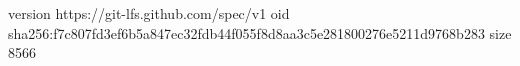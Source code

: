 version https://git-lfs.github.com/spec/v1
oid sha256:f7c807fd3ef6b5a847ec32fdb44f055f8d8aa3c5e281800276e5211d9768b283
size 8566
